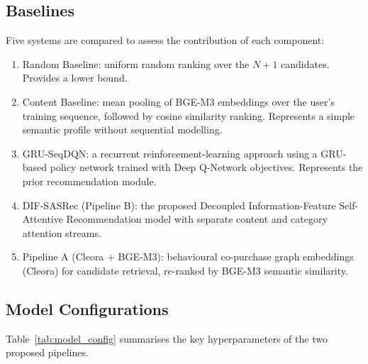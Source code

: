 \subsection{Baselines}

Five systems are compared to assess the contribution of each component:

\begin{enumerate}
    \item Random Baseline: uniform random ranking over the $N+1$ candidates. Provides a lower bound.
    \item Content Baseline: mean pooling of BGE-M3 embeddings over the user's training sequence, followed by cosine similarity ranking. Represents a simple semantic profile without sequential modelling.
    \item GRU-SeqDQN: a recurrent reinforcement-learning approach using a GRU-based policy network trained with Deep Q-Network objectives. Represents the prior recommendation module.
    \item DIF-SASRec (Pipeline B): the proposed Decoupled Information-Feature Self-Attentive Recommendation model with separate content and category attention streams.
    \item Pipeline A (Cleora + BGE-M3): behavioural co-purchase graph embeddings (Cleora) for candidate retrieval, re-ranked by BGE-M3 semantic similarity.
\end{enumerate}

\subsection{Model Configurations}

Table~\ref{tab:model_config} summarises the key hyperparameters of the two proposed pipelines.


